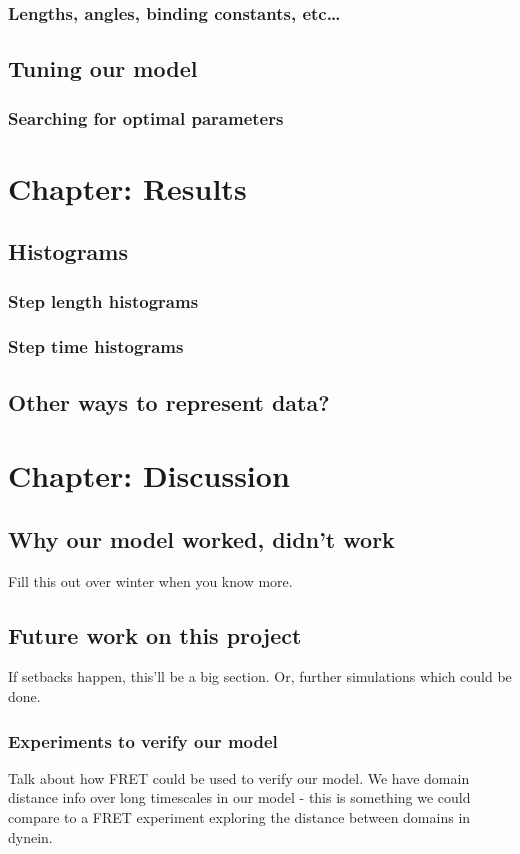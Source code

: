 \documentclass[10pt]{article} %
\begin{document}
		\subsubsection{Lengths, angles, binding constants, etc…}
	\subsection{Tuning our model}
	\subsubsection{Searching for optimal parameters}
\section{Chapter: Results}
	\subsection{Histograms}
		\subsubsection{Step length histograms}
		\subsubsection{Step time histograms}
	\subsection{Other ways to represent data?}


\section{Chapter: Discussion}
\subsection{Why our model worked, didn’t work}
Fill this out over winter when you know more.\\
\subsection{Future work on this project}
If setbacks happen, this'll be a big section. Or, further simulations which could be done.

\subsubsection{Experiments to verify our model}
Talk about how FRET could be used to verify our model. We have domain distance info over long
timescales in our model - this is something we could compare to a FRET experiment exploring
the distance between domains in dynein.\\
\end{document}
